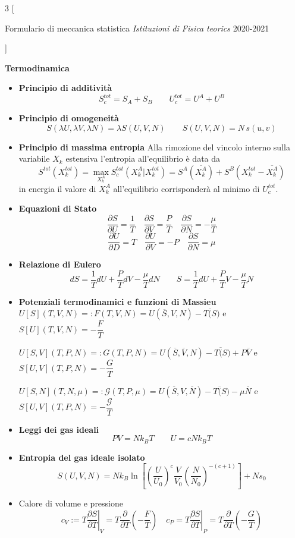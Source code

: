 \documentclass[10pt,a4paper]{report}
\begin{document}
\small
\begin{multicols*}{3}
[
\begin{center}
	Formulario di meccanica statistica \hspace{0.25\linewidth}\textit{Istituzioni di Fisica teorics} 2020-2021
\end{center}
]


\begin{center}
\textbf{\large Termodinamica}
\end{center}
\begin{center}

\begin{itemize}[label=$\cdot$]
\item \textbf{Principio di additività}
\[
S_c^{tot}=S_A+S_B \qquad U_c^{tot}=U^A+U^B
\]

\item \textbf{Principio di omogeneità}
\[
S(\lambda U, \lambda V, \lambda N)=\lambda S(U,V,N) \qquad S(U,V,N)=N\,s(u,v)
\]

\item \textbf{Principio di massima entropia} Alla rimozione del vincolo interno sulla variabile $X_k$ estensiva l'entropia all'equilibrio è data da
\[
S^{tot}(X_k^{tot})=\max_{X_k^A} S_c^{tot}(X_k^A|X_k^{tot})=S^A(\overline{X_k^A})+S^B(X_k^{tot}-\overline{X_k^A} )
\]
in energia il valore di $X_k^A$ all'equilibrio corrisponderà al minimo di $U_c^{tot}$.
\item \textbf{Equazioni di Stato}
\[
\dfrac{\partial S}{\partial U}=\dfrac{1}{T} \quad \dfrac{\partial S}{\partial V}=\dfrac{P}{T} \quad
\dfrac{\partial S}{\partial N}=-\dfrac{\mu}{T}
\]
\[
\dfrac{\partial U}{\partial D}=T \quad \dfrac{\partial U}{\partial V}=-P \quad
\dfrac{\partial S}{\partial N}=\mu
\]
\item \textbf{Relazione di Eulero}
\[
dS=\dfrac{1}{T}dU+\dfrac{P}{T}dV-\dfrac{\mu}{T}dN \qquad S=\dfrac{1}{T}dU+\dfrac{P}{T}V-\dfrac{\mu}{T}N
\]
\item \textbf{Potenziali termodinamici e funzioni di Massieu}
$U[S](T,V,N)=:F(T,V,N)=U(\overline{S},V,N)-T\overline(S) $ e $ S[U](T,V,N)=-\dfrac{F}{T}$

$U[S,V](T,P,N)=:G(T,P,N)=U(\overline{S},\overline{V},N)-T\overline(S)+P\overline{V} $ e $ S[U,V](T,P,N)=-\dfrac{G}{T}$

$U[S,N](T,N,\mu)=:\mathcal{G}(T,P,\mu)=U(\overline{S},V,\overline{N})-T\overline(S)-\mu\overline{N}$ e $ S[U,V](T,P,N)=-\dfrac{\mathcal{G}}{T}$
\item \textbf{Leggi dei gas ideali}
\[
PV=Nk_BT \qquad U=cNk_BT
\]
\item \textbf{Entropia del gas ideale isolato}
\[
S(U,V,N)=Nk_B\ln\left[ \left(\dfrac{U}{U_0}\right)^c \dfrac{V}{V_0} \left(\dfrac{N}{N_0}\right)^{-(c+1)} \right]+Ns_0
\]
\item Calore di volume e pressione
\[
c_V:=T\left.\dfrac{\partial S}{\partial T}\right|_V=T\dfrac{\partial}{\partial T}\left(-\dfrac{F}{T}\right)\quad 
c_P=T\left.\dfrac{\partial S}{\partial T}\right|_P=T\dfrac{\partial }{\partial T}\left(-\dfrac{G}{T} \right)
\]
\end{itemize}


\end{center}
\end{multicols*}
\end{document}
